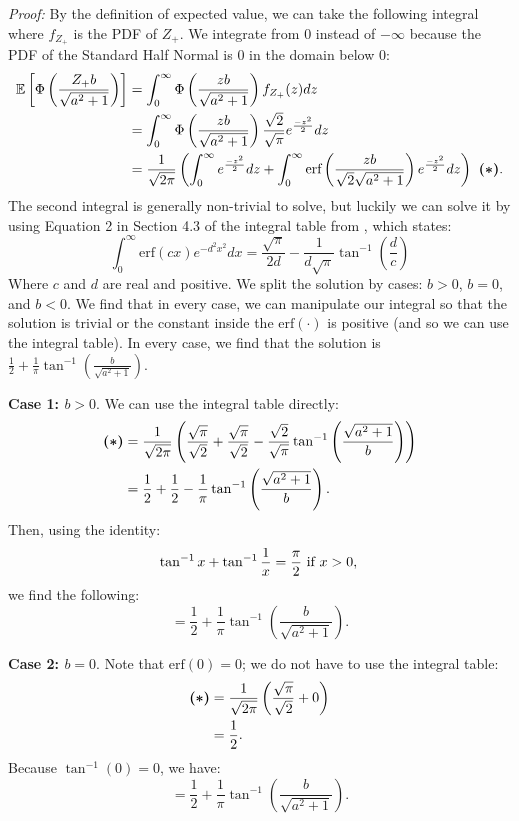 \documentclass{article} %
\begin{document}
\textit{Proof:} By the definition of expected value, we can take the following integral where $f_{Z_{+}}$ is the PDF of $Z_{+}$. We integrate from $0$ instead of $-\infty$ because the PDF of the Standard Half Normal is $0$ in the domain below $0$:
\begin{align*}
\mathbb{E}\left[\Phi\left(\frac{Z_{+}b}{\sqrt{a^2+1}}\right)\right] &= \int_{0}^{\infty} \Phi\left(\frac{zb}{\sqrt{a^2+1}}\right) f_{Z_{+}}(z) dz\\
&= \int_{0}^{\infty} \Phi\left(\frac{zb}{\sqrt{a^2+1}}\right) \frac{\sqrt{2}}{\sqrt{\pi}}e^{\frac{-z^2}{2}} dz\\
&= \frac{1}{\sqrt{2\pi}}\left(\int_{0}^{\infty} e^{\frac{-z^2}{2}}dz + \int_{0}^{\infty}\text{erf}\left(\frac{zb}{\sqrt{2}\sqrt{a^2+1}}\right) e^{\frac{-z^2}{2}} dz\right)\textbf{ (\textasteriskcentered)}.
\end{align*}
The second integral is generally non-trivial to solve, but luckily we can solve it by using Equation 2 in Section 4.3 of the integral table from \citet{ng1968table}, which states:
\[
\int_{0}^{\infty} \text{erf}(cx)e^{-d^2x^2}dx = \frac{\sqrt{\pi}}{2d} - \frac{1}{d\sqrt{\pi}}\tan^{-1}\left(\frac{d}{c}\right)
\]
Where $c$ and $d$ are real and positive. We split the solution by cases: $b>0$, $b=0$, and $b<0$. We find that in every case, we can manipulate our integral so that the solution is trivial or the constant inside the $\text{erf}(\cdot)$ is positive (and so we can use the integral table). In every case, we find that the solution is $\frac{1}{2} + \frac{1}{\pi}\tan^{-1}\left(\frac{b}{\sqrt{a^2+1}}\right)$.

\textbf{Case 1: $b>0$}. We can use the integral table directly:
\begin{align*}
\textbf{(\textasteriskcentered)} &= \frac{1}{\sqrt{2\pi}}\left(\frac{\sqrt{\pi}}{\sqrt{2}} + \frac{\sqrt{\pi}}{\sqrt{2}} - \frac{\sqrt{2}}{\sqrt{\pi}}\tan^{-1}\left(\frac{\sqrt{a^2+1}}{b}\right)\right)\\
&= \frac{1}{2} + \frac{1}{2} - \frac{1}{\pi}\tan^{-1}\left(\frac{\sqrt{a^2+1}}{b}\right).
\end{align*}
Then, using the identity:
\[
\tan^{-1}x + \tan^{-1}\frac{1}{x} = \frac{\pi}{2}\text{ if } x > 0, \\
\]
we find the following:
\[
=\frac{1}{2} + \frac{1}{\pi}\tan^{-1}\left(\frac{b}{\sqrt{a^2+1}}\right).
\]

\textbf{Case 2: $b=0$}. Note that $\text{erf}(0) = 0$; we do not have to use the integral table:
\begin{align*}
\textbf{(\textasteriskcentered)} &= \frac{1}{\sqrt{2\pi}}\left(\frac{\sqrt{\pi}}{\sqrt{2}} + 0\right)\\
&= \frac{1}{2}.
\end{align*}
Because $\tan^{-1}(0)=0$, we have:
\[
=\frac{1}{2} + \frac{1}{\pi}\tan^{-1}\left(\frac{b}{\sqrt{a^2+1}}\right).
\]
\end{document}
